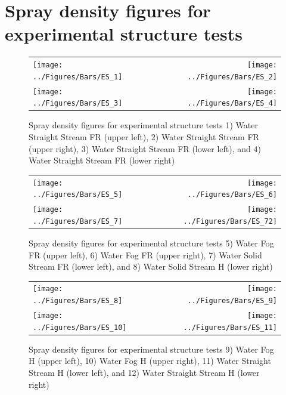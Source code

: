 \documentclass[12pt,oneside]{book}
\begin{document}
\clearpage

\section{Spray density figures for experimental structure tests}
\label{app:spray_es}

\begin{figure}[ht]
\begin{tabular*}{\textwidth}{lr}
\texttt{[image: ../Figures/Bars/ES\_1]} &
\texttt{[image: ../Figures/Bars/ES\_2]} \\
\texttt{[image: ../Figures/Bars/ES\_3]} &
\texttt{[image: ../Figures/Bars/ES\_4]}
\end{tabular*}
\caption{Spray density figures for experimental structure tests 1) Water Straight Stream FR (upper left), 2) Water Straight Stream FR (upper right), 3) Water Straight Stream FR (lower left), and 4) Water Straight Stream FR (lower right)}
\label{fig:es_1_4}
\end{figure}

\clearpage

\begin{figure}[ht]
\begin{tabular*}{\textwidth}{lr}
\texttt{[image: ../Figures/Bars/ES\_5]} &
\texttt{[image: ../Figures/Bars/ES\_6]} \\
\texttt{[image: ../Figures/Bars/ES\_7]} &
\texttt{[image: ../Figures/Bars/ES\_72]}
\end{tabular*}
\caption{Spray density figures for experimental structure tests 5) Water Fog FR (upper left), 6) Water Fog FR (upper right), 7) Water Solid Stream FR (lower left), and 8) Water Solid Stream H (lower right)}
\label{fig:es_5_72}
\end{figure}

\clearpage

\begin{figure}[ht]
\begin{tabular*}{\textwidth}{lr}
\texttt{[image: ../Figures/Bars/ES\_8]} &
\texttt{[image: ../Figures/Bars/ES\_9]} \\
\texttt{[image: ../Figures/Bars/ES\_10]} &
\texttt{[image: ../Figures/Bars/ES\_11]}
\end{tabular*}
\caption{Spray density figures for experimental structure tests 9) Water Fog H (upper left), 10) Water Fog H (upper right), 11) Water Straight Stream H (lower left), and 12) Water Straight Stream H (lower right)}
\label{fig:es_8_11}
\end{figure}
\end{document}
